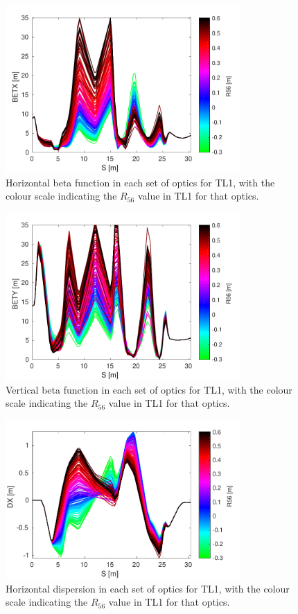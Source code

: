\begin{figure}
  \centering
  \includegraphics[width=0.8\textwidth]{Figures/propagation/BETX}
  \caption{Horizontal beta function in each set of optics for TL1, with the colour scale indicating the \(R_{56}\) value in TL1 for that optics.}
  \label{f:tl1BETX}
\end{figure}

\begin{figure}
  \centering
  \includegraphics[width=0.8\textwidth]{Figures/propagation/BETY}
  \caption{Vertical beta function in each set of optics for TL1, with the colour scale indicating the \(R_{56}\) value in TL1 for that optics.}
  \label{f:tl1BETY}
\end{figure}

\begin{figure}
  \centering
  \includegraphics[width=0.8\textwidth]{Figures/propagation/DX}
  \caption{Horizontal dispersion in each set of optics for TL1, with the colour scale indicating the \(R_{56}\) value in TL1 for that optics.}
  \label{f:tl1DX}
\end{figure}

